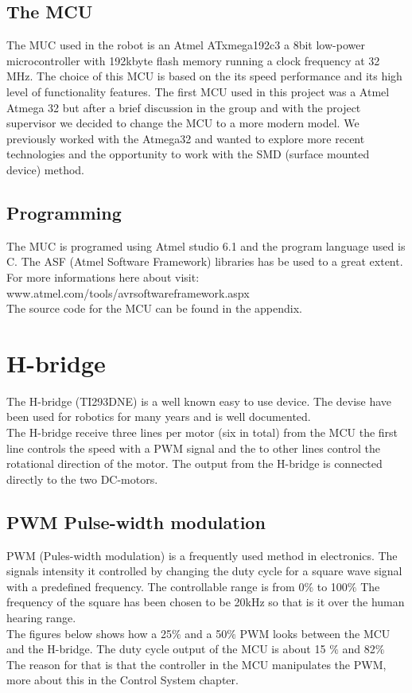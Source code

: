 \subsection{The MCU}
The MUC used in the robot is an Atmel ATxmega192c3 a 8bit low-power microcontroller with 192kbyte flash memory running a clock frequency at 32 MHz. The choice of this MCU is based on the its speed performance and its high level of functionality features. The first MCU used in this project was a Atmel Atmega 32 but after a brief discussion in the group and with the project supervisor we decided to change the MCU to a more modern model. We previously worked with the Atmega32 and wanted to explore more recent technologies and the opportunity to work with the SMD (surface mounted device) method. 

\subsection{Programming}
The MUC is programed using Atmel studio 6.1 and the program language used is C. The ASF (Atmel Software Framework) libraries has be used to a great extent. For more informations here about visit:\\  www.atmel.com/tools/avrsoftwareframework.aspx \\
The source code for the MCU can be found in the appendix. 

\section{H-bridge}
The H-bridge (TI293DNE) is a well known easy to use device. The devise have been used for robotics for many years and is well documented. \\  
The H-bridge receive three lines per motor (six in total) from the MCU the first line controls the speed with a PWM signal and the to other lines control the rotational direction of the motor. The output from the H-bridge is connected directly to the two DC-motors.


\newpage

\subsection{PWM Pulse-width modulation}

PWM (Pules-width modulation) is a frequently used method in electronics. The signals intensity it controlled by changing the duty cycle for a square wave signal with a predefined frequency. The controllable range is from 0$\% $ to 100$\%$ 
The frequency of the square has been chosen to be 20kHz so that is it over the human hearing range. 
\\
The figures below shows how a 25$\%$ and a 50$\%$  PWM looks between the MCU and the H-bridge. The duty cycle output of the MCU is about 15 $\%$ and 82$\%$ The reason for that is that the controller in the MCU manipulates the PWM, more about this in the Control System chapter.

